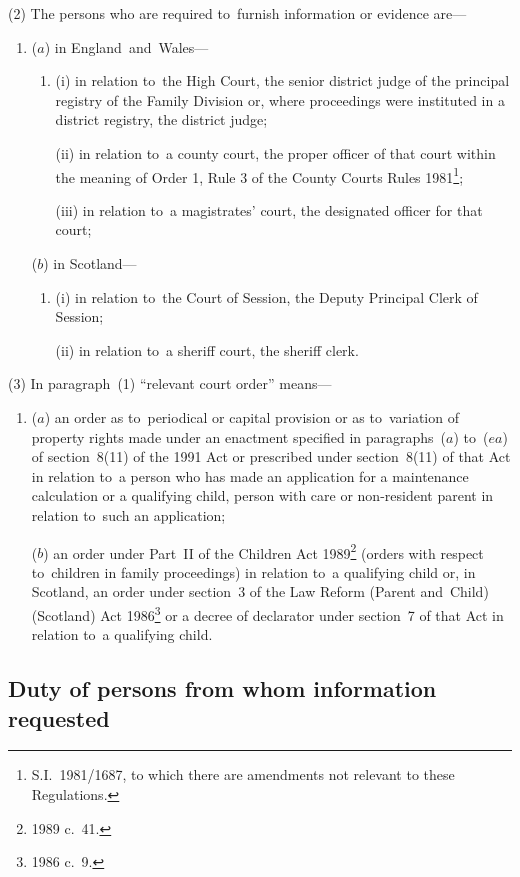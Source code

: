 \documentclass[12pt,a4paper]{article}
\begin{document}
(2) The persons who are required to~furnish information or evidence are—
\begin{enumerate}\item[]
($a$) in England~and~Wales—
\begin{enumerate}\item[]
(i) in relation to~the High Court, the senior district judge of the principal registry of the Family Division or, where proceedings were instituted in a district registry, the district judge;

(ii) in relation to~a county court, the proper officer of that court within the meaning of Order 1, Rule 3 of the County Courts Rules 1981\footnote{S.I.~1981/1687, to which there are amendments not relevant to these Regulations.};

(iii) in relation to~a magistrates’ court, the designated officer for that court;
\end{enumerate}

($b$) in Scotland—
\begin{enumerate}\item[]
(i) in relation to~the Court of Session, the Deputy Principal Clerk of Session;

(ii) in relation to~a sheriff court, the sheriff clerk.
\end{enumerate}
\end{enumerate}

(3) In paragraph~(1) “relevant court order” means—
\begin{enumerate}\item[]
($a$) an order as to~periodical or capital provision or as to~variation of property rights made under an enactment specified in paragraphs~($a$)  to~($ea$)  of section~8(11) of the 1991 Act or prescribed under section~8(11) of that Act in relation to~a person who has made an application for a maintenance calculation or a qualifying child, person with care or non-resident parent in relation to~such an application;

($b$) an order under Part~II of the Children Act 1989\footnote{1989 c.~41.} (orders with respect to~children in family proceedings) in relation to~a qualifying child or, in Scotland, an order under section~3 of the Law Reform (Parent and~Child) (Scotland) Act 1986\footnote{1986 c.~9.} or a decree of declarator under section~7 of that Act in relation to~a qualifying child.
\end{enumerate}

\subsection[7. Duty of persons from whom information requested]{Duty of persons from whom information requested}
\end{document}
